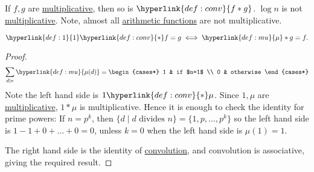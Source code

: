 \documentclass{article}
\begin{document}
\begin{fact}
  If $f,g$ are \hyperlink{def:multi}{multiplicative}, then so is $\hyperlink{def:conv}{f*g}$.
  $\log n $ is not \hyperlink{def:multi}{multiplicative}.
  Note, almost all \hyperlink{def:arith}{arithmetic functions} are not multiplicative.
\end{fact}
\begin{fact}
  \begin{equation*}
    \hyperlink{def:1}{1} \hyperlink{def:conv}{*} f = g \iff \hyperlink{def:mu}{\mu} * g = f.
  \end{equation*}
\end{fact}

\begin{proof}
  \begin{equation*}
    \sum_{d \mid n} \hyperlink{def:mu}{\mu(d)} =
    \begin{cases*}
      1 & if $n=1$ \\
      0 & otherwise
    \end{cases*}
  \end{equation*}
  Note the left hand side is $1\hyperlink{def:conv}{*}\mu$.
  Since $1,\mu$ are \hyperlink{def:multi}{multiplicative}, $1*\mu$ is multiplicative.
  Hence it is enough to check the identity for prime powers:
  If $n= p^k$, then $\{d \mid d\text{ divides }n\} = \{1,p,\ldots,p^k\}$ so the left hand side is $1-1 + 0 + \ldots + 0 = 0$, unless $k=0$ when the left hand side is $\mu(1) =1$.

  The right hand side is the identity of \hyperlink{def:conv}{convolution}, and convolution is associative, giving the required result.
\end{proof}
\end{document}
